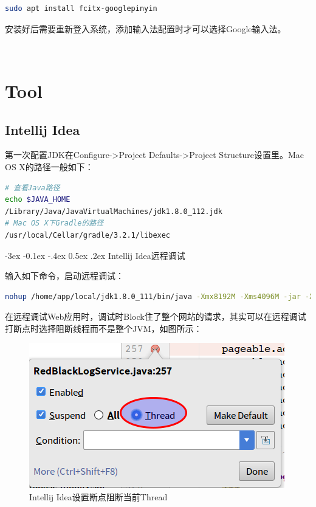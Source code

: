 \documentclass[12pt]{book}
\makeatletter
\numberwithin{dummy}{section}
\theoremstyle{ocrenumbox}
\theoremstyle{blacknumex}
\theoremstyle{blacknumbox}
\theoremstyle{ocrenum}
\renewcommand{\subsection}{\@startsection {subsection}{2}{\z@}
	{-3ex \@plus -0.1ex \@minus -.4ex}
	{0.5ex \@plus.2ex }
	{\normalfont\sffamily\bfseries}}
\makeatother
\begin{document}
\begin{lstlisting}[language=Bash]
sudo apt install fcitx-googlepinyin
\end{lstlisting}

安装好后需要重新登入系统，添加输入法配置时才可以选择Google输入法。

\newpage
~\vfil 

\part{Tool}

\newpage

\chapter{Intellij Idea}

第一次配置JDK在Configure->Project Defaults->Project Structure设置里。Mac OS X的路径一般如下：

\begin{lstlisting}[language=Bash]
# 查看Java路径
echo $JAVA_HOME
/Library/Java/JavaVirtualMachines/jdk1.8.0_112.jdk
# Mac OS X下Gradle的路径
/usr/local/Cellar/gradle/3.2.1/libexec
\end{lstlisting}

\subsection{Intellij Idea远程调试}

输入如下命令，启动远程调试：

\begin{lstlisting}[language=Bash]
nohup /home/app/local/jdk1.8.0_111/bin/java -Xmx8192M -Xms4096M -jar -Xdebug -Xrunjdwp:transport=dt_socket,suspend=n,server=y,address=5005 /home/app/backend/credit-system-web-boot-1.1.9.jar --spring.config.location=application.properties>/dev/null &
\end{lstlisting}

在远程调试Web应用时，调试时Block住了整个网站的请求，其实可以在远程调试打断点时选择阻断线程而不是整个JVM，如图所示：

\begin{figure}[htbp]
	\centering
	\includegraphics[scale=0.6]{intellijideabreakthread.png}
	\caption{Intellij Idea设置断点阻断当前Thread}
	\label{fig:intellijideabreakthread}
\end{figure}
\end{document}
